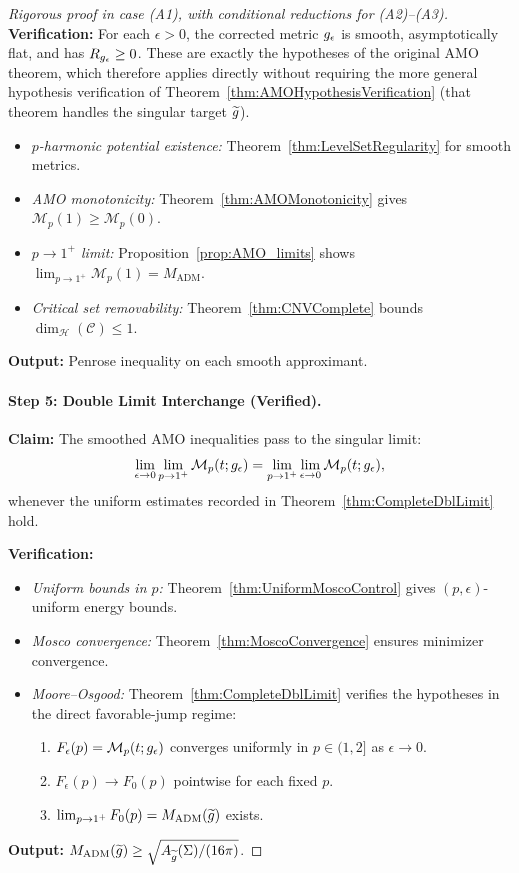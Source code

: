 \begin{proof}[Rigorous proof in case (A1), with conditional reductions for (A2)--(A3)]
\textbf{Verification:}
For each $\epsilon > 0$, the corrected metric $g_{\epsilon}$ is smooth, asymptotically flat, and has $R_{g_{\epsilon}} \ge 0$. These are exactly the hypotheses of the original AMO theorem, which therefore applies directly without requiring the more general hypothesis verification of Theorem~\ref{thm:AMOHypothesisVerification} (that theorem handles the singular target $\widetilde{g}$).
\begin{itemize}
    \item \textit{$p$-harmonic potential existence:} Theorem~\ref{thm:LevelSetRegularity} for smooth metrics.
    \item \textit{AMO monotonicity:} Theorem~\ref{thm:AMOMonotonicity} gives $\mathcal{M}_p(1) \ge \mathcal{M}_p(0)$.
    \item \textit{$p \to 1^+$ limit:} Proposition~\ref{prop:AMO_limits} shows $\lim_{p \to 1^+} \mathcal{M}_p(1) = M_{\mathrm{ADM}}$.
    \item \textit{Critical set removability:} Theorem~\ref{thm:CNVComplete} bounds $\dim_{\mathcal{H}}(\mathcal{C}) \le 1$.
\end{itemize}
\textbf{Output:} Penrose inequality on each smooth approximant.

\paragraph{Step 5: Double Limit Interchange (Verified).}
\textbf{Claim:} The smoothed AMO inequalities pass to the singular limit:
\begin{equation}
    \lim_{\epsilon \to 0} \lim_{p \to 1^+} \mathcal{M}_p(t; g_{\epsilon}) = \lim_{p \to 1^+} \lim_{\epsilon \to 0} \mathcal{M}_p(t; g_{\epsilon}),
\end{equation}
whenever the uniform estimates recorded in Theorem~\ref{thm:CompleteDblLimit} hold.

\textbf{Verification:}
\begin{itemize}
    \item \textit{Uniform bounds in $p$:} Theorem~\ref{thm:UniformMoscoControl} gives $(p,\epsilon)$-uniform energy bounds.
    \item \textit{Mosco convergence:} Theorem~\ref{thm:MoscoConvergence} ensures minimizer convergence.
    \item \textit{Moore--Osgood:} Theorem~\ref{thm:CompleteDblLimit} verifies the hypotheses in the direct favorable-jump regime:
    \begin{enumerate}
        \item $F_\epsilon(p) = \mathcal{M}_p(t; g_{\epsilon})$ converges uniformly in $p \in (1, 2]$ as $\epsilon \to 0$.
        \item $F_\epsilon(p) \to F_0(p)$ pointwise for each fixed $p$.
        \item $\lim_{p \to 1^+} F_0(p) = M_{\mathrm{ADM}}(\widetilde{g})$ exists.
    \end{enumerate}
\end{itemize}
\textbf{Output:} $M_{\mathrm{ADM}}(\widetilde{g}) \ge \sqrt{A_{\widetilde{g}}(\Sigma)/(16\pi)}$.


\end{proof}
